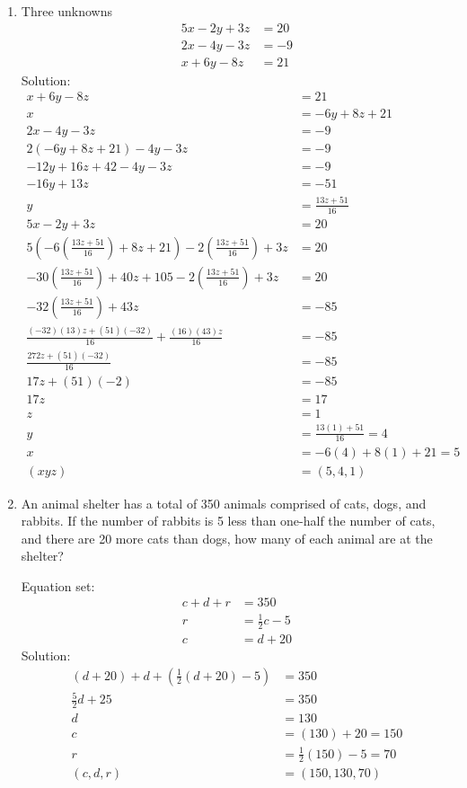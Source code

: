 \documentclass[12pt]{article}
\begin{document}
\begin{enumerate}
    \item Three unknowns 
    \begin{align*}
        5x - 2y + 3z &= 20
        \\ 2x - 4y - 3z &= -9
        \\ x + 6y -8z &= 21
    \end{align*}
    Solution: 
    \begin{align*}
        x + 6y -8z &= 21
        \\ x &= -6y + 8z +21
        \\ 2x - 4y - 3z &= -9
        \\ 2(-6y + 8z +21) - 4y - 3z &= -9
        \\ -12y + 16z + 42 -4y -3z &= -9
        \\ -16y + 13z &= -51
        \\ y &= \frac{13z +51}{16}
        \\ 5x - 2y + 3z &= 20
        \\ 5\left( -6\left(\frac{13z +51}{16}\right) + 8z +21 \right)-2\left(\frac{13z +51}{16}\right)+ 3z &= 20
        \\  -30\left(\frac{13z +51}{16}\right) +40z +105-2\left(\frac{13z +51}{16}\right)+ 3z &= 20
        \\ -32\left(\frac{13z +51}{16}\right) +43z &= -85
        \\ \frac{(-32)(13)z + (51)(-32)}{16} + \frac{(16)(43)z}{16} &= -85
        \\ \frac{272z + (51)(-32)}{16} &= -85
        \\ 17z + (51)(-2) &= -85
        \\ 17z &= 17
        \\ z&= 1
        \\ y &= \frac{13(1) + 51}{16} = 4
        \\ x&= -6(4) + 8(1) +21 = 5
        \\ (xyz) &= (5,4,1)
    \end{align*}

\item An animal shelter has a total of 350 animals comprised of cats, dogs, and rabbits. If the number of
rabbits is 5 less than one-half the number of cats, and there are 20 more cats than dogs, how many of
each animal are at the shelter?

Equation set: 
\begin{align*}
    c+d+r &= 350
    \\ r &= \frac{1}{2}c-5
    \\ c &= d+20
\end{align*}
Solution:
\begin{align*}
    (d+20) + d +\left( \frac{1}{2}(d+20) -5 \right) &= 350
    \\ \frac{5}{2}d +25 &= 350
    \\ d &= 130
    \\ c &= (130) + 20 = 150
    \\ r &= \frac{1}{2}(150) -5 = 70
    \\ (c,d,r) &= (150,130,70)
\end{align*}
\end{enumerate}
\end{document}
